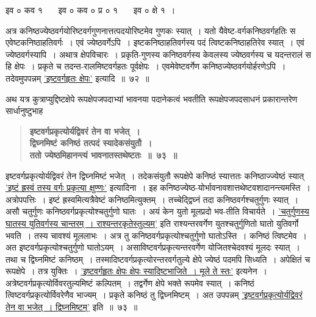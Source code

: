 \documentclass[11pt, openany]{book}
\begin{document}
\begin{sloppypar}
\begin{center}
इव ० कव १ ~~~इव ० कव ० प्र ० १ ~~~इव ० क्षे १~।
\end{center}

अत्र कनिष्ठज्येष्ठवर्गयोरिष्टवर्गगुणनात्तत्पदयोरिष्टमेव गुणकः स्यात्~। यतो यैवेष्ट-वर्गकनिष्ठवर्गहतिः स एवेष्टकनिष्ठाहतिवर्गः~। एवं ज्येष्ठवर्गेऽपि~। इष्टकनिष्ठाहतिवर्गस्य पदं त्विष्टकनिष्ठाहतिरेव स्यात्~। एवं ज्येष्ठवर्गस्यापि~। अथात्र क्षेपविचारः~। प्रकृति-गुणस्य कनिष्ठवर्गस्य केवलस्य ज्येष्ठवर्गस्य च यदन्तरालं स हि क्षेपः~। प्रकृते च तदन्त-रालमिष्टवर्गहतः पूर्वक्षेपः~। एवमेवेष्टवर्गेण कनिष्ठज्येष्ठवर्गयोर्हरणेऽपि~। तदेवमुपपन्नम् \hyperref[6.72]{'इष्टवर्गहृतः क्षेपः'} इत्यादि~॥~७२~॥
\end{sloppypar}

\newpage

\begin{sloppypar}
{\small अथ यत्र कुत्राप्युद्दिष्टक्षेपे रूपक्षेपजपदाभ्यां भावनया पदानेकत्वं भवतीति रूपक्षेपजपदसाधनं प्रकारान्तरेण सार्धानुष्टुभाह\textendash }

 \label{6.73}
\begin{quote}
{\large \textbf{{\color{purple}इष्टवर्गप्रकृत्योर्यद्विवरं तेन वा भजेत्~।\\
द्विघ्नमिष्टं कनिष्ठं तत्पदं स्यादेकसंयुतौ~।\\
ततो ज्येष्ठमिहानन्त्यं भावनातस्तथेष्टतः~॥~७३~॥}}}
\end{quote}

इष्टवर्गप्रकृत्योर्यद्विवरं तेन द्विघ्नमिष्टं भजेत्~। तदेकसंयुतौ रूपक्षेपे कनिष्ठं स्यात्ततः कनिष्ठाज्ज्येष्ठं स्यात् \hyperref[6.70]{'इष्टं ह्रस्वं तस्य वर्गः प्रकृत्या क्षुण्णः'} इत्यादिना~। इह कनिष्ठज्येष्ठ-योर्भावनावशात्तथेष्टवशादानन्त्यमस्ति~।\\

अत्रोपपत्तिः~। इष्टं ह्रस्वमित्यत्रैवेष्टं कनिष्ठमित्युक्तम्~। तच्चेद्द्विघ्नं तदा कनिष्ठवर्गश्चतुर्गुणः स्यात्~। असौ चतुर्गुणः कनिष्ठवर्गप्रकृत्योश्चतुर्गुणो घातः~। अयं केन युतो मूलप्रदो भव-तीति विचार्यते~। \hyperref[8.131]{'चतुर्गुणस्य घातस्य युतिवर्गस्य चान्तरम्~। राश्यन्तरकृतेस्तुल्यम्'} इति राश्यन्तरवर्गेण युतश्चतुर्गुणितो घातो युतिवर्गो भवति~। तस्य चावश्यं मूललाभः~। अत्र तु कनिष्ठवर्गप्रकृत्योश्चतुर्गुणो घातोऽस्ति~। कनिष्ठं त्विष्टमेव~। अत इष्टवर्गप्रकृत्योश्चतुर्गुणो घातोऽयम्~। असाविष्टवर्गप्रकृत्यन्तरवर्गेण योजितश्चेदवश्यं मूलदः स्यात्~। तथा च द्विघ्नमिष्टं कनिष्ठम्~। तस्मादिष्टवर्गप्रकृत्योरन्तरवर्गतुल्ये क्षेपे ज्येष्ठं पदमपि सिध्यति~। अपेक्षितं च रूपक्षेपे~। तत्र युक्तिः~। \hyperref[6.72]{'इष्टवर्गहृतः क्षेपः क्षेपः स्यादिष्टभाजिते~। मूले ते स्तः'} इत्यनेन~। अत्रेष्टवर्गप्रकृत्योर्विवरतुल्यमिष्टं कल्पितम्~। तद्वर्गेण क्षेपे भक्ते रूपमेव स्यात्~। कनिष्ठं त्विष्टवर्गप्रकृत्योर्विवरेणैव भाज्यम्~। प्रकृते कनिष्ठं तु द्विघ्नमिष्टम्~। अत उपपन्नम् \hyperref[6.73]{'इष्टवर्गप्रकृत्योर्यद्विवरं तेन वा भजेत्~। द्विघ्नमिष्टम्'} इति~॥~७३~॥\\


\end{sloppypar}
\end{document}
